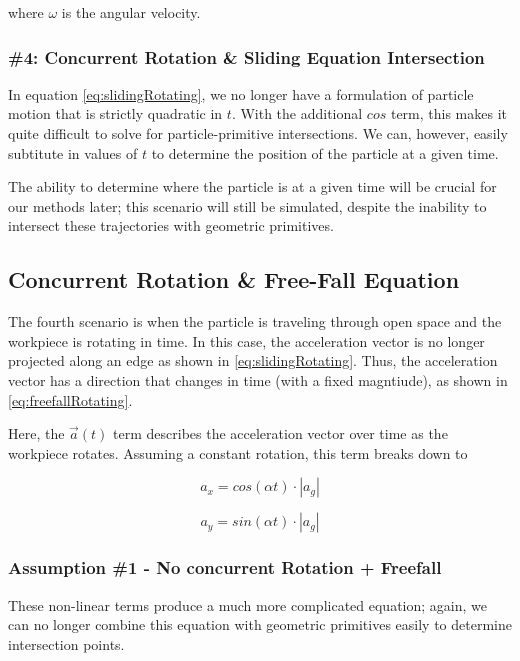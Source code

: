where $\omega$ is the angular velocity.

		\subsubsection{\#4: Concurrent Rotation \& Sliding Equation Intersection}

In equation \eqref{eq:slidingRotating}, we no longer have a formulation of particle motion that is strictly quadratic in $t$. With the additional $cos$ term, this makes it quite difficult to solve for particle-primitive intersections. We can, however, easily subtitute in values of $t$ to determine the position of the particle at a given time.

The ability to determine where the particle is at a given time will be crucial for our methods later; this scenario will still be simulated, despite the inability to intersect these trajectories with geometric primitives.

		\subsection{Concurrent Rotation \& Free-Fall Equation}

The fourth scenario is when the particle is traveling through open space and the workpiece is rotating in time. In this case, the acceleration vector is no longer projected along an edge as shown in \eqref{eq:slidingRotating}. Thus, the acceleration vector has a direction that changes in time (with a fixed magntiude), as shown in \eqref{eq:freefallRotating}.

 {
	\label{eq:freefallRotating}
}

Here, the $\vec{a}(t)$ term describes the acceleration vector over time as the workpiece rotates. Assuming a constant rotation, this term breaks down to

$$
a_x = cos(\alpha t) \cdot |a_g|
$$

$$
a_y = sin(\alpha t) \cdot |a_g|
$$

		\subsubsection{Assumption \#1 - No concurrent Rotation + Freefall}

These non-linear terms produce a much more complicated equation; again, we can no longer combine this equation with geometric primitives easily to determine  intersection points.

